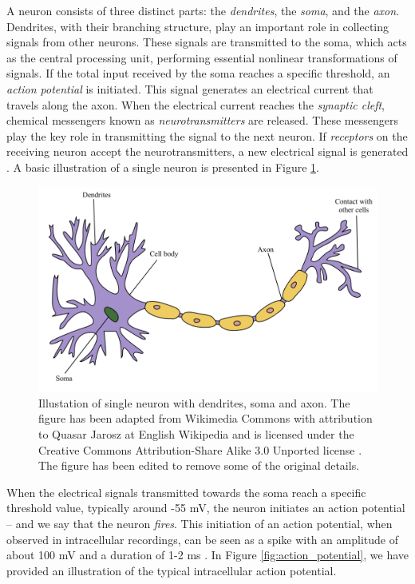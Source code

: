 \documentclass[a4paper, UKenglish, 11pt]{uiomaster}
\begin{document}
A neuron consists of three distinct parts: the \emph{dendrites}, the \emph{soma}, and the \emph{axon}. Dendrites, with their branching structure, play an important role in collecting signals from other neurons. These signals are transmitted to the soma, which acts as the central processing unit, performing essential nonlinear transformations of signals. If the total input received by the soma reaches a specific threshold, an \emph{action potential} is initiated. This signal generates an electrical current that travels along the axon. When the electrical current reaches the \emph{synaptic cleft}, chemical messengers known as \emph{neurotransmitters} are released. These messengers play the key role in transmitting the signal to the next neuron. If \emph{receptors} on the receiving neuron accept the neurotransmitters, a new electrical signal is generated \cite{gerstner2014neuronal}. A basic illustration of a single neuron is presented in Figure \ref{fig:neuron}.

\begin{figure}
    \centering
    \includegraphics[width=1.0\linewidth]{figures/Neuron_wikimedia.png}
    \caption{Illustation of single neuron with dendrites, soma and axon. The figure has been adapted from Wikimedia Commons with attribution to Quasar Jarosz at English Wikipedia and is licensed under the Creative Commons Attribution-Share Alike 3.0 Unported license \cite{wikimedia-neuron}. The figure has been edited to remove some of the original details.}
    \label{fig:neuron}
\end{figure}


When the electrical signals transmitted towards the soma reach a specific threshold value, typically around -55 mV, the neuron initiates an action potential -- and we say that the neuron \emph{fires}. This initiation of an action potential, when observed in intracellular recordings, can be seen as a spike with an amplitude of about 100 mV and a duration of 1-2 ms \cite{gerstner2014neuronal}. In Figure \ref{fig:action_potential}, we have provided an illustration of the typical intracellular action potential.
\end{document}
